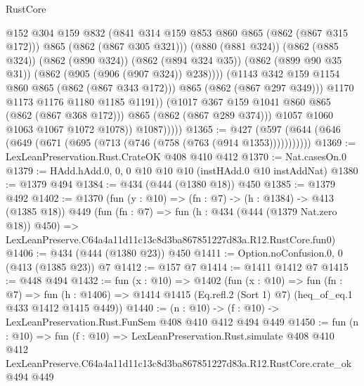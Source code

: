 \begin{lexlean}{RustCore}
\begin{coremodule}
                                @152
                                @304
                                @159
                                @832
                                (@841 @314 @159 @853 @860 @865 (@862 (@867 @315 @172)))
                                @865
                                (@862 (@867 @305 @321)))
                              (@880 (@881 @324))
                              (@862 (@885 @324))
                              (@862 (@890 @324))
                              (@862 (@894 @324 @35))
                              (@862 (@899 @90 @35 @31))
                              (@862 (@905 (@906 (@907 @324)) @238))))
                          (@1143 @342 @159 @1154 @860 @865 (@862 (@867 @343 @172)))
                          @865
                          (@862 (@867 @297 @349)))
                        @1170
                        @1173
                        @1176
                        @1180
                        @1185
                        @1191))
                    (@1017 @367 @159 @1041 @860 @865 (@862 (@867 @368 @172)))
                    @865
                    (@862 (@867 @289 @374)))
                  @1057
                  @1060
                  @1063
                  @1067
                  @1072
                  @1078))
              @1087)))))
@1365 := @427 (@597 (@644 (@646 (@649 (@671 (@695 (@713 (@746 (@758 (@763 (@914 @1353)))))))))))
@1369 := LexLeanPreservation.Rust.CrateOK @408 @410 @412
@1370 := Nat.casesOn.{0}
@1379 := HAdd.hAdd.{0, 0, 0} @10 @10 @10 (instHAdd.{0} @10 instAddNat)
@1380 := @1379 @494
@1384 := @434 (@444 (@1380 @18)) @450
@1385 := @1379 @492
@1402 := @1370
    (fun (y : @10) => (fn : @7) -> (h : @1384) -> @413 (@1385 @18))
    @449
    (fun (fn : @7) =>
    fun (h : @434 (@444 (@1379 Nat.zero @18)) @450) =>
    LexLeanPreserve.C64a4a11d11c13c8d3ba867851227d83a.R12.RustCore.fun0)
@1406 := @434 (@444 (@1380 @23)) @450
@1411 := Option.noConfusion.{0, 0} (@413 (@1385 @23)) @7
@1412 := @157 @7
@1414 := @1411 @1412 @7
@1415 := @448 @494
@1432 := fun (x : @10) =>
  @1402
    (fun (x : @10) =>
    fun (fn : @7) =>
    fun (h : @1406) => @1414 @1415 (Eq.refl.{2} (Sort 1) @7) (heq_of_eq.{1} @433 @1412 @1415 @449))
@1440 := (n : @10) -> (f : @10) -> LexLeanPreservation.Rust.FunSem @408 @410 @412 @494 @449
@1450 := fun (n : @10) =>
  fun (f : @10) =>
  LexLeanPreservation.Rust.simulate
    @408
    @410
    @412
    LexLeanPreserve.C64a4a11d11c13c8d3ba867851227d83a.R12.RustCore.crate_ok
    @494
    @449
\end{coremodule}
\end{lexlean}
